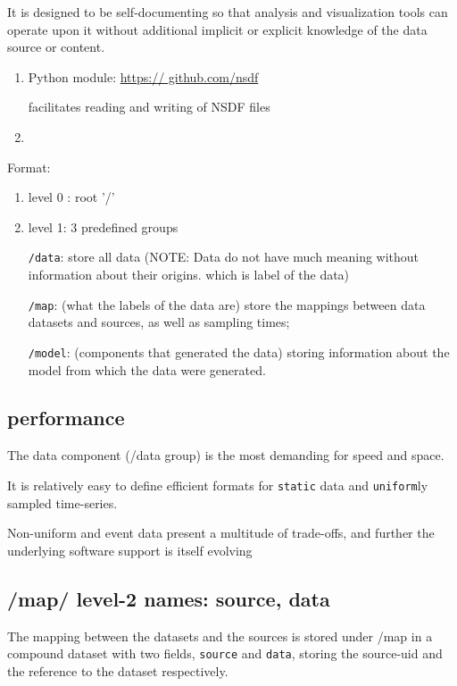 It is designed to be self-documenting so that analysis and visualization tools
can operate upon it without additional implicit or explicit knowledge of the
data source or content.
\begin{enumerate}
  \item Python module: \url{https://
github.com/nsdf}

facilitates reading and writing of NSDF files

  \item 
\end{enumerate}


Format:
\begin{enumerate}
  \item level 0 : root '/'
  
  \item level 1: 3 predefined groups
  
\verb!/data!: store all data (NOTE: Data do not have much meaning without
information about their origins. which is label of the data)



\verb!/map!: (what the labels of the data are) store the mappings between data
datasets and sources, as well as sampling times;

\verb!/model!: (components that generated the data) storing information
about the model from which the data were generated.
\end{enumerate}

\subsection{performance }

The data component (/data group) is the most demanding for speed and space.

It is relatively easy to define efficient formats for \verb!static! data and
\verb!uniform!ly sampled time-series.

Non-uniform and event data present a multitude of trade-offs, and further the
underlying software support is itself evolving



\subsection{/map/ level-2 names: source, data}
\label{sec:NSDF-format-/map/-level-2}

The mapping between the datasets and the sources is stored under /map in a
compound dataset with two fields, \verb!source! and \verb!data!, storing the
source-uid and the reference to the dataset respectively.

